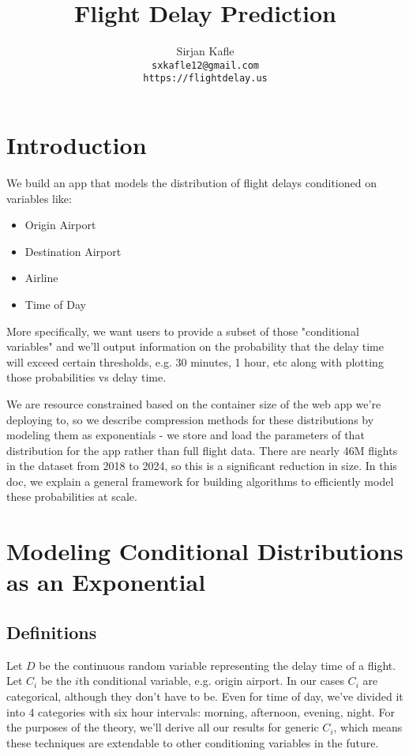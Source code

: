 \documentclass{article}
\title{Flight Delay Prediction}
\author{%
  Sirjan Kafle \\
  \texttt{sxkafle12@gmail.com} \\
  \texttt{https://flightdelay.us}
}
\begin{document}
\maketitle

\section{Introduction}
We build an app that models the distribution of flight delays conditioned on variables like:
\begin{itemize}
  \item Origin Airport
  \item Destination Airport
  \item Airline
  \item Time of Day
\end{itemize}

More specifically, we want users to provide a subset of those "conditional variables" and we'll output information on the probability that the delay
time will exceed certain thresholds, e.g. 30 minutes, 1 hour, etc along with plotting those probabilities vs delay time.

We are resource constrained based on the container size of the web app we're deploying to, so we describe compression methods for these distributions by modeling them as exponentials - we store
and load the parameters of that distribution for the app rather than full flight data. There are nearly 46M flights in the dataset from 2018 to 2024, so
this is a significant reduction in size. In this doc, we explain a general framework for building algorithms to efficiently model these probabilities at scale.

\section{Modeling Conditional Distributions as an Exponential}
\subsection{Definitions}
Let $D$ be the continuous random variable representing the delay time of a flight. Let $C_i$ be the $i$th conditional variable, e.g. origin airport.
In our cases $C_i$ are categorical, although they don't have to be. Even for time of day, we've divided it into 4 categories with six hour intervals: morning, afternoon, evening, night.
For the purposes of the theory, we'll derive all our results for generic $C_i$, which means these techniques are extendable to other conditioning variables
in the future.
\end{document}
